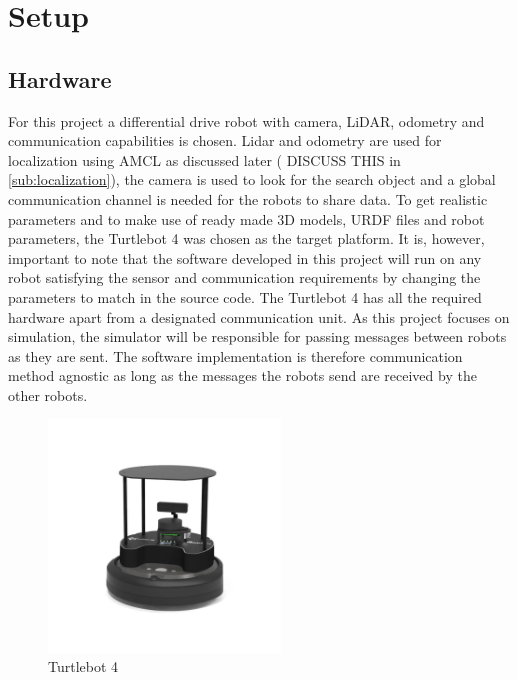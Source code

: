 \section{Setup}
\label{sec:setup}

\subsection{Hardware}

For this project a differential drive robot with camera, LiDAR, odometry and communication capabilities is chosen. Lidar and odometry are used for localization using AMCL as discussed later ({\color{red} DISCUSS THIS} in \cref{sub:localization}), the camera is used to look for the search object and a global communication channel is needed for the robots to share data. To get realistic parameters and to make use of ready made 3D models, URDF files and robot parameters, the Turtlebot 4 \cite{tb4} was chosen as the target platform. It is, however, important to note that the software developed in this project will run on any robot satisfying the sensor and communication requirements by changing the parameters to match in the source code. The Turtlebot 4 has all the required hardware apart from a {\color{red} designated communication unit}. As this project focuses on simulation, the simulator will be responsible for passing messages between robots as they are sent. The software implementation is therefore {\color{red} communication method agnostic} as long as the messages the robots send are received by the other robots.

\begin{figure}[h]
    \begin{center}
        \includegraphics[width=0.55\textwidth]{figures/tb4.png}
    \end{center}
    \caption{Turtlebot 4}\label{fig:tb4}
\end{figure}



